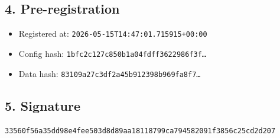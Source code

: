 \documentclass{article}
\begin{document}
\subsection*{4. Pre-registration}
\begin{itemize}
\item Registered at: \texttt{2026-05-15T14:47:01.715915+00:00}
\item Config hash: \texttt{1bfc2c127c850b1a04fdff3622986f3f\dots}
\item Data hash: \texttt{83109a27c3df2a45b912398b969fa8f7\dots}
\end{itemize}
\subsection*{5. Signature}
\texttt{33560f56a35dd98e4fee503d8d89aa18118799ca794582091f3856c25cd2d207}\\
\end{document}
